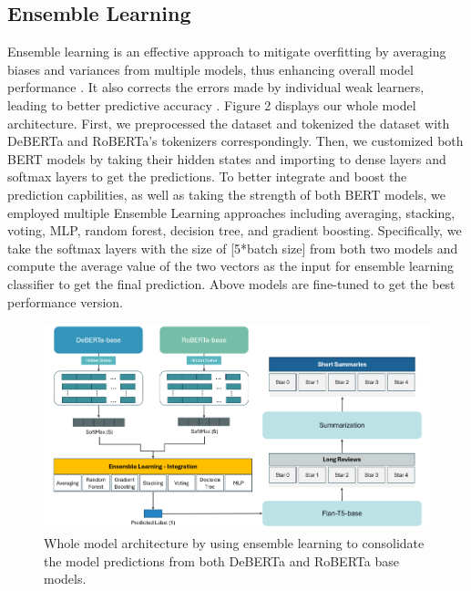 \documentclass[11pt]{article}
\begin{document}
\subsection{Ensemble Learning}
Ensemble learning is an effective approach to mitigate overfitting by averaging biases and variances from multiple models, thus enhancing overall model performance \citep{opitz1999popular}. It also corrects the errors made by individual weak learners, leading to better predictive accuracy \citep{schapire1990strength}. Figure 2 displays our whole model architecture. First, we preprocessed the dataset and tokenized the dataset with DeBERTa and RoBERTa’s tokenizers correspondingly. Then, we customized both BERT models by taking their hidden states and importing to dense layers and softmax layers to get the predictions. To better integrate and boost the prediction capbilities, as well as taking the strength of both BERT models, we employed multiple Ensemble Learning approaches including averaging, stacking, voting, MLP, random forest, decision tree, and gradient boosting. Specifically, we take the softmax layers with the size of [5*batch size] from both two models and compute the average value of the two vectors as the input for ensemble learning classifier to get the final prediction. Above models are fine-tuned to get the best performance version.

\begin{figure}[h!]
  \centering
  \includegraphics[width=1.0\textwidth, height=0.3\textheight]{./model_architecture.png}
  \caption{Whole model architecture by using ensemble learning to consolidate the model predictions from both DeBERTa and RoBERTa base models.}
  \label{fig:model_architecture}
\end{figure}
\end{document}
